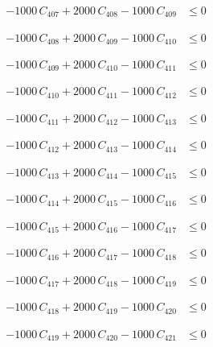 \documentclass[a4paper,11pt]{article}
\begin{document}
\begin{align}
-1000\,C_{407} + 2000\,C_{408} - 1000\,C_{409} &\leq 0 \nonumber
\end{align}

\begin{align}
-1000\,C_{408} + 2000\,C_{409} - 1000\,C_{410} &\leq 0 \nonumber
\end{align}

\begin{align}
-1000\,C_{409} + 2000\,C_{410} - 1000\,C_{411} &\leq 0 \nonumber
\end{align}

\begin{align}
-1000\,C_{410} + 2000\,C_{411} - 1000\,C_{412} &\leq 0 \nonumber
\end{align}

\begin{align}
-1000\,C_{411} + 2000\,C_{412} - 1000\,C_{413} &\leq 0 \nonumber
\end{align}

\begin{align}
-1000\,C_{412} + 2000\,C_{413} - 1000\,C_{414} &\leq 0 \nonumber
\end{align}

\begin{align}
-1000\,C_{413} + 2000\,C_{414} - 1000\,C_{415} &\leq 0 \nonumber
\end{align}

\begin{align}
-1000\,C_{414} + 2000\,C_{415} - 1000\,C_{416} &\leq 0 \nonumber
\end{align}

\begin{align}
-1000\,C_{415} + 2000\,C_{416} - 1000\,C_{417} &\leq 0 \nonumber
\end{align}

\begin{align}
-1000\,C_{416} + 2000\,C_{417} - 1000\,C_{418} &\leq 0 \nonumber
\end{align}

\begin{align}
-1000\,C_{417} + 2000\,C_{418} - 1000\,C_{419} &\leq 0 \nonumber
\end{align}

\begin{align}
-1000\,C_{418} + 2000\,C_{419} - 1000\,C_{420} &\leq 0 \nonumber
\end{align}

\begin{align}
-1000\,C_{419} + 2000\,C_{420} - 1000\,C_{421} &\leq 0 \nonumber
\end{align}
\end{document}

